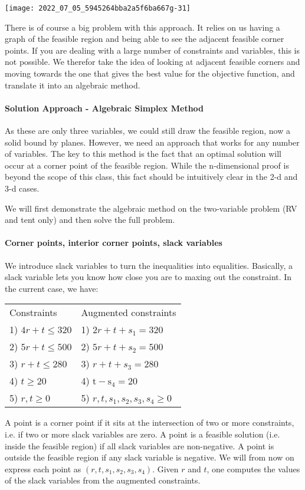 \texttt{[image: 2022\_07\_05\_5945264bba2a5f6ba667g-31]}

There is of course a big problem with this approach. It relies on us having a graph of the feasible region and being able to see the adjacent feasible corner points. If you are dealing with a large number of constraints and variables, this is not possible. We therefor take the idea of looking at adjacent feasible corners and moving towards the one that gives the best value for the objective function, and translate it into an algebraic method.

\paragraph{Solution Approach - Algebraic Simplex Method}
As these are only three variables, we could still draw the feasible region, now a solid bound by planes. However, we need an approach that works for any number of variables. The key to this method is the fact that an optimal solution will occur at a corner point of the feasible region. While the n-dimensional proof is beyond the scope of this class, this fact should be intuitively clear in the 2-d and 3-d cases.

We will first demonstrate the algebraic method on the two-variable problem (RV and tent only) and then solve the full problem.

\paragraph{Corner points, interior corner points, slack variables}
We introduce slack variables to turn the inequalities into equalities. Basically, a slack variable lets you know how close you are to maxing out the constraint. In the current case, we have:

\begin{tabular}{ll}
Constraints &
Augmented constraints\\
1) $4 r+t \leq 320$ &
1) $2 r+t+s_{1}=320$\\
2) $5 r+t \leq 500$&
2) $5 r+t+s_{2}=500$\\
3) $r+t \leq 280$&
3) $r+t+s_{3}=280$\\
4) $t \geq 20$&
4) $\mathrm{t}-\mathrm{s}_{4}=20$\\
5) $r, t \geq 0$&
5) $r, t, s_{1}, s_{2}, s_{3}, s_{4} \geq 0$
\end{tabular}

A point is a corner point if it sits at the intersection of two or more constraints, i.e. if two or more slack variables are zero. A point is a feasible solution (i.e. inside the feasible region) if all slack variables are non-negative. A point is outside the feasible region if any slack variable is negative. We will from now on express each point as $\left(r, t, s_{1}, s_{2}, s_{3}, s_{4}\right)$. Given $r$ and $t$, one computes the values of the slack variables from the augmented constraints.

